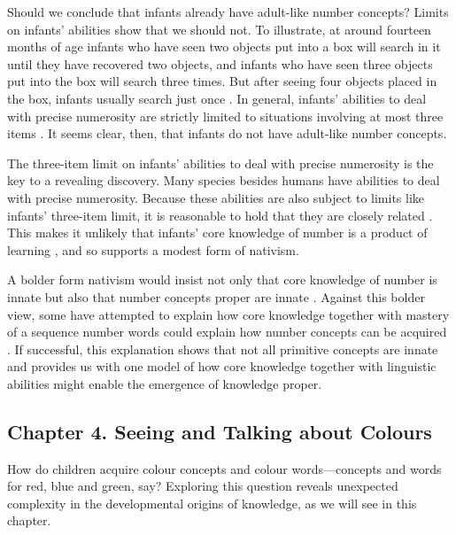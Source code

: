\documentclass[12pt,\papersize]{extarticle}
\begin{document}
Should we conclude that infants already have adult-like number concepts?  
Limits on infants' abilities show that we should not. 
To illustrate, 
at around fourteen months of age infants who have seen two objects put into a box will search in it until they have recovered two objects, and infants who have seen three objects put into the box will search three times.
But after seeing four objects placed in the box, infants usually search just once \citep{feigenson_tracking_2003}. 
In general, infants' abilities to deal with precise numerosity are strictly limited to situations involving at most three items \citep{feigenson_tracking_2003}.
It seems clear, then, that infants do not have adult-like number concepts. 

The three-item limit on infants' abilities to deal with precise numerosity is the key to a revealing discovery.
Many species besides humans have abilities to deal with precise numerosity.
Because these abilities are also subject to limits like infants' three-item limit, it is reasonable to hold that they are  closely related \citep{hauser:2003_spontaneous}.  
This makes it unlikely that infants' core knowledge of number is  a product of learning \citep{feigenson:2004_core}, and so supports a modest form of nativism.

A bolder form nativism would insist not only that core knowledge of number is innate but also that number concepts proper are innate \citep{Fodor:1981ep}. 
Against this bolder view, some have attempted to explain how core knowledge together with mastery of a sequence number words could explain how number concepts can be acquired \citep{carey:2009_origin}. 
If successful, this explanation shows that not all primitive concepts are innate and provides us with one model of how core knowledge together with linguistic abilities might enable the emergence of knowledge proper.



\subsection{Chapter 4. Seeing and Talking about Colours}
How do children acquire colour concepts and colour words---concepts and words for red, blue and green, say? 
Exploring this question reveals unexpected complexity in the developmental origins of knowledge, as we will see in this chapter.
\end{document}
